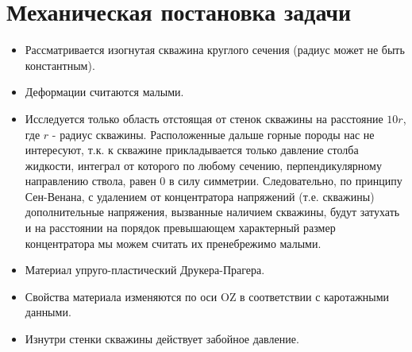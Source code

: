 \documentclass[a4paper,14pt]{scrartcl}
\begin{document}
\section{Механическая постановка задачи}
\begin{itemize}
    \item Рассматривается изогнутая скважина круглого сечения (радиус может не быть константным).
    \item Деформации считаются малыми.
    \item Исследуется только область отстоящая от стенок скважины на расстояние $10r$, где $r$ - радиус скважины. Расположенные дальше горные породы нас не интересуют, т.к. к скважине прикладывается только давление столба жидкости, интеграл от которого по любому сечению, перпендикулярному направлению ствола, равен $0$ в силу симметрии. Следовательно, по принципу Сен-Венана, с удалением от концентратора напряжений (т.е. скважины) дополнительные напряжения, вызванные наличием скважины, будут затухать и на расстоянии на порядок превышающем характерный размер концентратора мы можем считать их пренебрежимо малыми.
    \item Материал упруго-пластический Друкера-Прагера.
    \item Свойства материала изменяются по оси OZ в соответствии с каротажными данными.
    \item Изнутри стенки скважины действует забойное давление.
\end{itemize}
\end{document}
